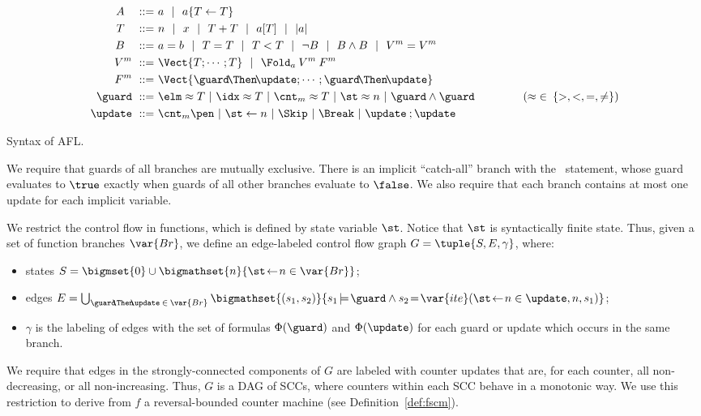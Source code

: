\begin{table}[t]
\begin{align*}
  A~~~::=~& a ~~|~~ a\{T \leftarrow T\} \\
T~~~::=~& n ~~|~~ x ~~|~~ T+T ~~|~~ a[T] ~~|~~ |a| \\
B~~~::=~& a = b  ~~|~~ T = T ~~|~~ T < T ~~|~~ \neg B ~~|~~ B \land B ~~|~~    
  V^m = V^m \\
  V^m~::=~& \Vect{T;\cdots;T} ~~|~~ \Fold_{a}\: V^m\: F^m 
  ~~~~~~~~~~~~~~~~~~~~~~~~~~~~ \\
F^m~::=~& \Vect{\guard \!\Then\! \update;\cdots;\guard \!\Then\! \update} \\
\guard ~::=~&  \elm \approx T ~|~ \idx \approx T ~|~ \cnt_m \approx T  ~|~  \st \approx  n ~|~ \guard \land \guard \hspace{15mm}\text{($\approx \;\in\: \{>,<,=, \ne\}$)}\\
  \update ~::=~&  \cnt_m \pen ~|~ \st \leftarrow n ~|~ \Skip ~|~ \Break ~|~  \update \:; \update
\end{align*}
\vspace*{2mm}
\caption{Syntax of AFL.}
\label{tab:syntax}
\end{table}


We require that guards of all branches are mutually exclusive. There is an implicit ``catch-all'' branch with the \Break\ statement, whose guard evaluates to $\true$ exactly when guards of all other  branches evaluate to $\false$. We also require that each branch contains at most one update for each implicit variable.

We restrict the control flow in functions, which is defined by state variable $\st$. Notice that $\st$ is syntactically finite state. Thus, given a set of function branches $\var{Br}$, we define an edge-labeled control flow graph $G = \tuple{S,E, \gamma}$, where:
\begin{itemize}
\item states $S = \bigmset{0} \cup \bigmathset{n}{\st \!\leftarrow\! n \in \var{Br}}$;
\item edges $E = \bigcup_{\guard \!\!\Then\!\! \update \:\in\: \var{Br}} \bigmathset{(s_1,s_2)}{s_1 \!\models\! \guard \land s_2 \!=\! \var{ite}(\st \!\leftarrow\! n \in \update,n,s_1)}$;
\item $\gamma$ is the labeling of edges with the set of formulas $\Phi(\guard)$ and $\Phi(\update)$ for each guard or update which occurs in the same branch.
\end{itemize}
We require that edges in the strongly-connected components of $G$ are labeled with counter updates that are, for each counter, all non-decreasing, or all non-increasing. Thus, $G$ is a DAG of SCCs, where counters within each SCC behave in a monotonic way. We use this restriction to derive from $f$ a reversal-bounded counter machine (see Definition~\ref{def:fscm}).

